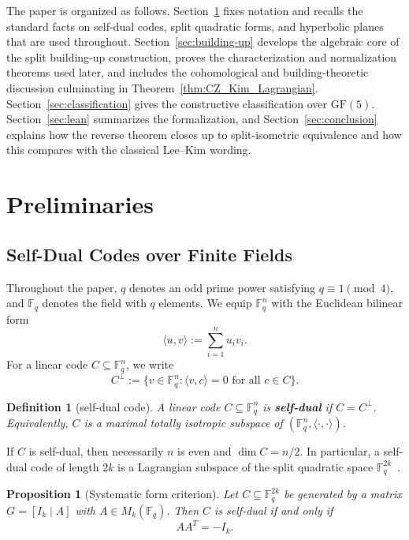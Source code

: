 \documentclass[12pt]{article}
\newtheorem{defn}{Definition}[section]
\newtheorem{prop}[theorem]{Proposition}
\newcommand{\F}{\mathbb{F}}
\newcommand{\GF}[1]{\ensuremath{\mathrm{GF}(#1)}}
\begin{document}
The paper is organized as follows. Section~\ref{sec:background} fixes notation and recalls the standard facts on self-dual codes, split quadratic forms, and hyperbolic planes that are used throughout. Section~\ref{sec:building-up} develops the algebraic core of the split building-up construction, proves the characterization and normalization theorems used later, and includes the cohomological and building-theoretic discussion culminating in Theorem~\ref{thm:CZ_Kim_Lagrangian}. Section~\ref{sec:classification} gives the constructive classification over $\GF{5}$. Section~\ref{sec:lean} summarizes the formalization, and Section~\ref{sec:conclusion} explains how the reverse theorem closes up to split-isometric equivalence and how this compares with the classical Lee--Kim wording.


\section{Preliminaries}
\label{sec:background}

\subsection{Self-Dual Codes over Finite Fields}

Throughout the paper, $q$ denotes an odd prime power satisfying $q \equiv 1 \pmod 4$, and $\F_q$ denotes the field with $q$ elements. We equip $\F_q^n$ with the Euclidean bilinear form
\[
\langle u,v\rangle := \sum_{i=1}^n u_i v_i.
\]
For a linear code $C \subseteq \F_q^n$, we write
\[
C^\perp := \{v \in \F_q^n : \langle v,c\rangle = 0 \text{ for all } c \in C\}.
\]

\begin{defn}[self-dual code]\label{def:sd}
{\rm
A linear code $C \subseteq \F_q^n$ is \textbf{self-dual} if $C = C^{\perp}$. Equivalently, $C$ is a maximal totally isotropic subspace of $(\F_q^n,\langle \cdot,\cdot\rangle)$.
}
\end{defn}

\noindent
If $C$ is self-dual, then necessarily $n$ is even and $\dim C = n/2$.
 In particular, a self-dual code of length $2k$ is a Lagrangian subspace of the split quadratic space $\F_q^{2k}$~\cite{Mon}.

\begin{prop}[Systematic form criterion]\label{prop:systematic-form}
Let $C \subseteq \F_q^{2k}$ be generated by a matrix $G = [I_k \mid A]$ with $A \in M_k(\F_q)$. Then $C$ is self-dual if and only if
\[
AA^T = -I_k.
\]
\end{prop}
\end{document}
